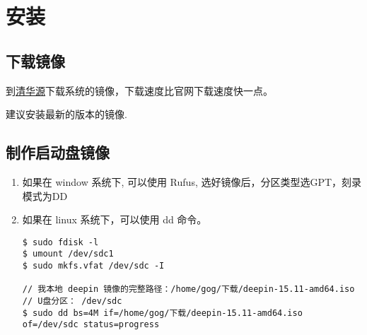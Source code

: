\section{安装}
\subsection{下载镜像}
到\href{https://mirrors.tuna.tsinghua.edu.cn/deepin-cd/}{清华源}下载系统的镜像，下载速度比官网下载速度快一点。

建议安装最新的版本的镜像.
\subsection{制作启动盘镜像}
\flushleft
\begin{enumerate}
\item 如果在 window 系统下, 可以使用 Rufus, 选好镜像后，分区类型选GPT，刻录模式为DD
\item 如果在 linux 系统下，可以使用 dd 命令。
\begin{lstlisting}
$ sudo fdisk -l 
$ umount /dev/sdc1
$ sudo mkfs.vfat /dev/sdc -I

// 我本地 deepin 镜像的完整路径：/home/gog/下载/deepin-15.11-amd64.iso 
// U盘分区： /dev/sdc
$ sudo dd bs=4M if=/home/gog/下载/deepin-15.11-amd64.iso of=/dev/sdc status=progress
\end{lstlisting}

\end{enumerate}